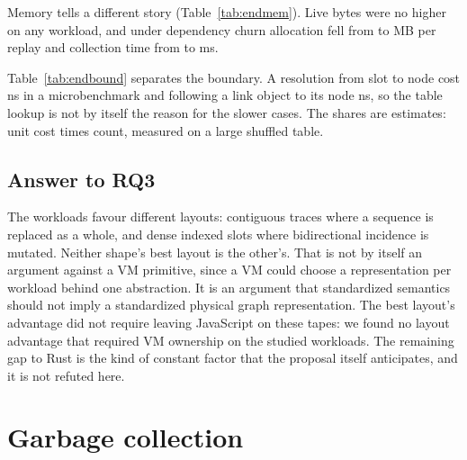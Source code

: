 \documentclass[11pt]{article}
\begin{document}
Memory tells a different story (Table~\ref{tab:endmem}). Live bytes were no higher on any workload, and under dependency churn allocation fell from \mSixDynamicAllocF{} to \mSixDynamicAllocD{} MB per replay and collection time from \mSixDynamicGcF{} to \mSixDynamicGcD{} ms.

\begin{table}[tbp]
\centering
\footnotesize

\caption{Medians for the frozen (F) and dense (D) builds: allocated MB per replay, live MB after setup, collection ms per replay, and peak resident MB.}
\label{tab:endmem}
\end{table}

Table~\ref{tab:endbound} separates the boundary. A resolution from slot to node cost \mSixSlotNs{} ns in a microbenchmark and following a link object to its node \mSixFieldNs{} ns, so the table lookup is not by itself the reason for the slower cases. The shares are estimates: unit cost times count, measured on a large shuffled table.

\begin{table}[tbp]
\centering
\footnotesize

\caption{Slot-to-node resolutions in the dense build, and an estimate of their cost.}
\label{tab:endbound}
\end{table}

\subsection{Answer to RQ3}

The workloads favour different layouts: contiguous traces where a sequence is replaced as a whole, and dense indexed slots where bidirectional incidence is mutated. Neither shape's best layout is the other's. That is not by itself an argument against a VM primitive, since a VM could choose a representation per workload behind one abstraction. It is an argument that standardized semantics should not imply a standardized physical graph representation. The best layout's advantage did not require leaving JavaScript on these tapes: we found no layout advantage that required VM ownership on the studied workloads. The remaining gap to Rust is the kind of constant factor that the proposal itself anticipates, and it is not refuted here.

\section{Garbage collection}
\label{sec:gc}
\end{document}
